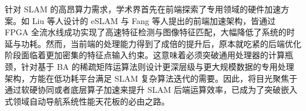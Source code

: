 针对 SLAM 的高昂算力需求，学术界首先在前端探索了专用领域的硬件加速方案。如 Liu 等人设计的 eSLAM\cite{liu2019eslam} 与 Fang 等人提出的前端加速架构\cite{fang2019fpga}，皆通过 FPGA 全流水线成功实现了高速特征检测与图像特征匹配，大幅降低了系统的时延与功耗。然而，当前端的处理能力得到了成倍的提升后，原本就吃紧的后端优化阶段面临着更加密集的特征点输入约束。这意味着必须突破通用处理器的计算瓶颈，针对基于 BA 的稀疏矩阵运算法则设计更深层级与更大规模数据的专用处理架构，方能在低功耗平台满足 SLAM 复杂算法迭代的需要。因此，将目光聚焦于通过软硬协同或者底层算子加速来提升 SLAM 后端运算效率，已成为了突破嵌入式领域自动导航系统性能天花板的必由之路。
